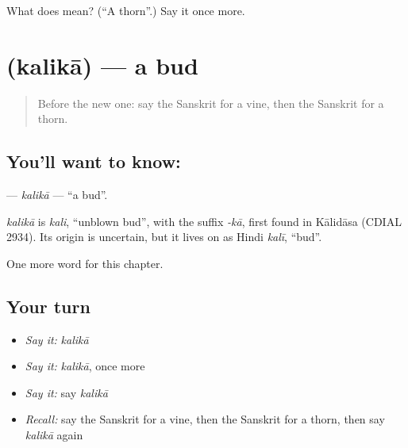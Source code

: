 \begin{tcolorbox}[breakable,colback=teal!4,colframe=teal!35!black,title={Before you move on}]
What does  mean? (\textquotedblleft{}A thorn\textquotedblright{}.) Say it once more.
\end{tcolorbox}
\section[\texorpdfstring{\sk{कलिका} (kalikā)}{कलिका (kalikā)}]{ (kalikā) — a bud}

\label{lesson:SA-C252-kalika}



\begin{quote}
Before the new one: say the Sanskrit for a vine, then the Sanskrit for a thorn.
\end{quote}

\subsection*{You'll want to know: }
\textbf{} — \emph{kalikā} — \textquotedblleft{}a bud\textquotedblright{}.

\begin{cousinweb}
\emph{kalikā} is \emph{kali}, \textquotedblleft{}unblown bud\textquotedblright{}, with the suffix \emph{-kā}, first found in Kālidāsa (CDIAL 2934). Its origin is uncertain, but it lives on as Hindi \emph{kalī}, \textquotedblleft{}bud\textquotedblright{}.
\end{cousinweb}

\begin{grammarlens}[title={What you've built}]
One more word for this chapter.
\end{grammarlens}

\subsection*{Your turn}
\begin{itemize}
\raggedright
  \item \emph{Say it:} \emph{kalikā}
  \item \emph{Say it:} \emph{kalikā}, once more
  \item \emph{Say it:} say \emph{kalikā}
  \item \emph{Recall:} say the Sanskrit for a vine, then the Sanskrit for a thorn, then say \emph{kalikā} again
\end{itemize}

